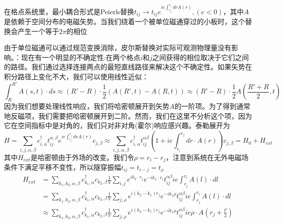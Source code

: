 \documentclass{article}
\numberwithin{equation}{subsection}
\begin{document}
在格点系统里，最小耦合形式是Peierls替换$t_{ij}\rightarrow t_{ij}e^{ie\int_{r_j}^{r_i}drA(r)},(e<0)$，其中$A$是依赖于空间分布的电磁矢势。当我们绕着一个被单位磁通穿过的小板时，这个替换会产生一个等于$2\pi$的相位
\begin{center}
\end{center}
由于单位磁通可以通过规范变换消除，皮尔斯替换对实际可观测物理量没有影响。：现在有一个明显的不确定性:在两个格点$i$和$j$之间获得的相位取决于它们之间的路径。我们通过选择连接两点的最短直线路径来解决这个不确定性。如果矢势在积分路径上变化不大，我们可以使用线性近似：
\begin{equation}
    \int_{R}^{R'}A(s,t)\cdot ds\approx(R'-R)\cdot\frac{1}{2}(A(R',t)-A(R,t))\approx(R'-R)\cdot\frac{1}{2}A(\frac{R'+R}{2},t)
\end{equation}
因为我们想要处理线性响应，我们将哈密顿展开到矢势$A$的一阶项。为了得到通常地反磁项，我们需要把哈密顿展开到二阶。然而，我们在这里不分析这个项，因为它在空间指标中是对角的，我们只对非对角(霍尔)响应感兴趣。泰勒展开为
\begin{equation}
    H=\sum_{i,j,\alpha,\beta}c_{i,\alpha}^\dagger t_{ij}^{\alpha,\beta}e^{ie\int_{r_i}^{r_j}drA(r)}c_{j,\beta}\approx\sum_{i,j,\alpha,\beta}c_{i,\alpha}^\dagger t_{ij}^{\alpha\beta}(1+ie\int_{r_i}^{r_j}dr\cdot A(r))c_{j,\beta}=H_0+H_{ext}
\end{equation}
其中$H_{ext}$是哈密顿由于外场的改变。我们令$\rho=r_i-r_j$，注意到系统在无外电磁场条件下满足平移不变性，所以隧穿振幅$t_{ij}=t_{i-j}=t_\rho$
\begin{equation}
    \begin{split}
        H_{ext}&=\sum_{k_1,k_2,\alpha,\beta}c_{k_1,\alpha}^\dagger c_{k_2,\beta}\frac{1}{V}\sum_{i,j}e^{ik_2\cdot r_j}e^{-ik_1\cdot r_i}t_{ij}^{\alpha\beta}ie\int_{r_j}^{r_i}A(l)\cdot dl\\
        &=\sum_{k_1,k_2,\alpha,\beta}c_{k_1,\alpha}^\dagger c_{k_2,\beta}\frac{1}{V}\sum_{j,\rho}e^{i(k_2-k_1)r_j}e^{-ik_1\rho}t_{ij}^{\alpha\beta}ie\int_{r_j}^{r_i}A(l)\cdot dl\\
        &\approx\sum_{k_1,k_2,\alpha,\beta}c_{k_1,\alpha}^\dagger c_{k_2,\beta}\frac{1}{V}\sum_{j,\rho}e^{i(k_2-k_1)r_j}e^{-ik_1\rho}t_{ij}^{\alpha\beta}ie\rho\cdot A(r_j+\frac{\rho}{2})\\
    \end{split}
\end{equation}
\end{document}
